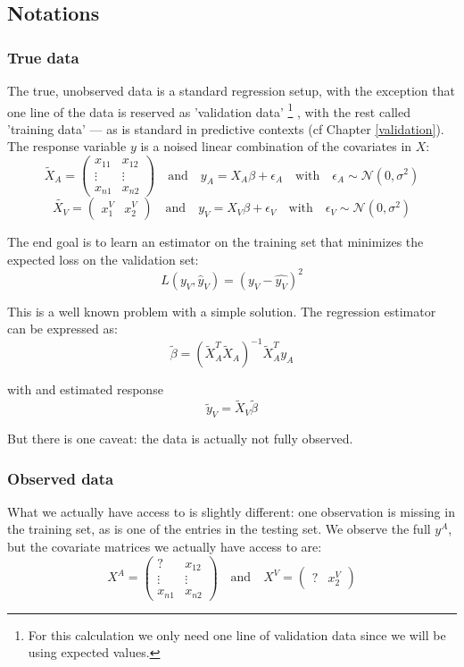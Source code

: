 \documentclass[12pt, a4paper]{memoir}
\begin{document}
		\subsection{Notations}
			\subsubsection{True data}
The true, unobserved data is a standard regression setup, with the exception that one line of the data is reserved as 'validation data'
\footnote{For this calculation we only need one line of validation data since we will be using expected values.}
, with the rest called 'training data' --- as is standard in predictive contexts (cf Chapter \ref{validation}). The response variable $y$ is a noised linear combination of the covariates in $X$:
\begin{equation*}
\tilde{X}_A = 
\begin{pmatrix}
x_{11} & x_{12} \\
\vdots & \vdots \\
x_{n1} & x_{n2}
\end{pmatrix}
\quad \mathrm{and} \quad
y_A = X_A \beta + \epsilon_A
\quad \mathrm{with} \quad
\epsilon_A \sim \mathcal{N}(0, \sigma^2)
\end{equation*}
\begin{equation*}
\tilde{X_V} = 
\begin{pmatrix}
x_{1}^V & x_{2}^V
\end{pmatrix}
\quad \mathrm{and} \quad
y_V = X_V \beta + \epsilon_V
\quad \mathrm{with} \quad
\epsilon_V \sim \mathcal{N}(0, \sigma^2)
\end{equation*}

The end goal is to learn an estimator on the training set that minimizes the expected loss on the validation set:
$$
L(y_V, \hat{y}_V) = (y_V - \hat{y_V})^2
$$

This is a well known problem with a simple solution. The regression estimator can be expressed as:
$$ \tilde{\beta} = (\tilde{X}_A^T \tilde{X}_A)^{-1} \tilde{X}_A^T y_A $$

with and estimated response
$$ \tilde{y}_V = \tilde{X}_V \tilde{\beta} $$

But there is one caveat: the data is actually not fully observed.

			\subsubsection{Observed data}
What we actually have access to is slightly different: one observation is missing in the training set, as is one of the entries in the testing set. We observe the full $y^A$, but the covariate matrices we actually have access to are:
\begin{equation*}
X^A = 
\begin{pmatrix}
? & x_{12} \\
\vdots & \vdots \\
x_{n1} & x_{n2}
\end{pmatrix}
\quad \mathrm{and} \quad
X^V = 
\begin{pmatrix}
? & x_{2}^V
\end{pmatrix}
\end{equation*}
\end{document}

